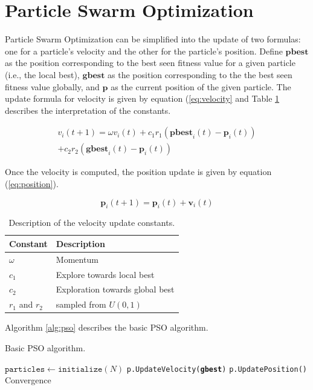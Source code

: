 \section{Particle Swarm Optimization}\label{sec:pso}
Particle Swarm Optimization can be simplified into the update of two formulas:
one for a particle's velocity and the other for the particle's position. Define
$\textbf{pbest}$ as the position corresponding to the best seen fitness value
for a given particle (i.e., the local best), $\textbf{gbest}$ as the position
corresponding to the the best seen fitness value globally, and $\textbf{p}$ as
the current position of the given particle. The update formula for velocity is
given by equation (\ref{eq:velocity} and Table \ref{tab:constants} describes
the interpretation of the constants.

\begin{multline}\label{eq:velocity}
  v_i(t+1) = \omega v_i (t) + c_1 r_1 (\textbf{pbest}_i(t) - \textbf{p}_i(t)) \\
  + c_2 r_2 (\textbf{gbest}_i(t) - \textbf{p}_i(t))
\end{multline}

Once the velocity is computed, the position update is given by equation
(\ref{eq:position}).

\begin{equation}\label{eq:position}
  \textbf{p}_i(t+1) = \textbf{p}_i(t) + \textbf{v}_i(t)
\end{equation}

\begin{table}
  \caption{Description of the velocity update constants.}\label{tab:constants}
  \begin{tabular}{ll}\toprule
  \textbf{Constant} & \textbf{Description}\\\midrule
  $\omega$ & Momentum\\
  $c_1$ & Explore towards local best\\
  $c_2$ & Exploration towards global best\\
  $r_1$ and $r_2$ & sampled from $U(0,1)$\\\bottomrule
  \end{tabular}
\end{table}

Algorithm \ref{alg:pso} describes the basic PSO algorithm.

\begin{algorithm}
  \caption{Basic PSO algorithm.}\label{alg:pso}
  \begin{algorithmic}[1]
    \State $\texttt{particles} \gets \texttt{initialize}(N)$
    \Repeat
    \State \texttt{p.UpdateVelocity(\textbf{gbest})}
    \State \texttt{p.UpdatePosition()}
    \EndFor
    \Until Convergence
    \EndProcedure
  \end{algorithmic}
\end{algorithm}

